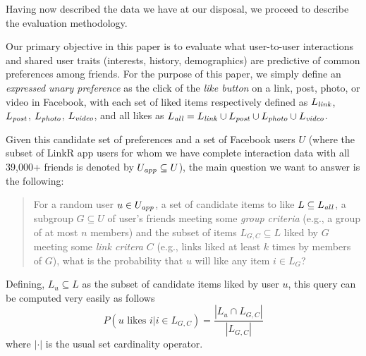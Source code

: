 Having now described the data we have at our disposal, we proceed
to describe the evaluation methodology.


Our primary objective in this paper is to evaluate what user-to-user
interactions and shared user traits (interests, history, demographics)
are predictive of common preferences among friends.  For the purpose
of this paper, we simply define an \emph{expressed unary preference}
as the click of the \emph{like button} on a link, post, photo, or
video in Facebook, with each set of liked items respectively defined as
$L_{\mathit{link}}$, $L_{\mathit{post}}$, $L_{\mathit{photo}}$, $L_{\mathit{video}}$, and all likes as $L_{\mathit{all}}
= L_{\mathit{link}} \cup L_{\mathit{post}} \cup L_{\mathit{photo}} \cup L_{\mathit{video}}$.

Given this candidate set of preferences and a set of Facebook users
$U$ (where the subset of LinkR app users for whom 
we have complete interaction data with all 39,000+ friends
is denoted by $U_{\mathit{app}} \subseteq U$), the main
question we want to answer is the following: 

\begin{quote}
For a random user $u \in U_{\mathit{app}}$, a set of candidate items to like $L
\subseteq L_{\mathit{all}}$, a subgroup $G \subseteq U$ of user's friends
meeting some \emph{group criteria} (e.g., a group of at most $n$
members) and the subset of items $L_{G,C} \subseteq L$ liked by $G$
meeting some \emph{link critera} $C$ (e.g., links liked at least $k$
times by members of $G$), what is the probability that $u$ will like
any item $i \in L_G$?
\end{quote}

Defining, $L_u \subseteq L$ as the subset of candidate items liked
by user $u$, this query can be computed very easily as follows
\begin{equation}
P(u \mbox{ likes } i | i \in L_{G,C}) = \frac{|L_u \cap L_{G,C}|}{|L_{G,C}|}
\end{equation}
where $|\cdot|$ is the usual set cardinality operator.

